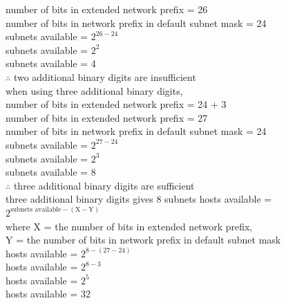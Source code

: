\documentclass[a4paper]{systems-software}
\begin{document}
\begin{longtabu}
	\hspace{5mm} number of bits in extended network prefix = 26\\
	\hspace{5mm} number of bits in network prefix in default subnet mask = 24 \\
	\hspace{5mm} subnets available = $2^{26 - 24}$ \\
	\hspace{5mm} subnets available = $2^{2}$ \\
	\hspace{5mm} subnets available = 4 \\
	$\therefore$ two additional binary digits are insufficient \\
	\vspace{2.5mm}
	when using three additional binary digits, \\
	\hspace{5mm} number of bits in extended network prefix = 24 + 3\\
	\hspace{5mm} number of bits in extended network prefix = 27\\
	\hspace{5mm} number of bits in network prefix in default subnet mask = 24 \\
	\hspace{5mm} subnets available = $2^{27 - 24}$ \\
	\hspace{5mm} subnets available = $2^{3}$ \\
	\hspace{5mm} subnets available = 8 \\
	$\therefore$ three additional binary digits are sufficient \\
	\vspace{2.5mm}
	three additional binary digits gives 8 subnets
	\vspace{2.5mm}
	hosts available = $2^{\text{subnets available} - (\text{X} - \text{Y})}$ \\
	where X = the number of bits in extended network prefix, \\
	Y = the number of bits in network prefix in default subnet mask \\
	\vspace{2.5mm}
	hosts available = $2^{8 - (27 - 24)}$ \\
	hosts available = $2^{8 - 3}$ \\
	hosts available = $2^{5}$ \\
	hosts available = 32 \\
	\hline
\end{longtabu}
\end{document}
